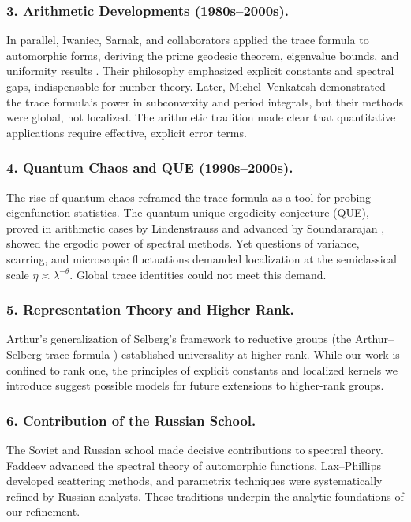 \subsubsection*{3. Arithmetic Developments (1980s–2000s).}
In parallel, Iwaniec, Sarnak, and collaborators applied the trace formula to automorphic forms,
deriving the prime geodesic theorem, eigenvalue bounds, and uniformity results
\cite{Iwaniec2002,LuoSarnak1995}. Their philosophy emphasized explicit constants and spectral gaps,
indispensable for number theory. Later, Michel–Venkatesh \cite{MichelVenkatesh2010}
demonstrated the trace formula’s power in subconvexity and period integrals,
but their methods were global, not localized.
The arithmetic tradition made clear that quantitative applications
require effective, explicit error terms.

\subsubsection*{4. Quantum Chaos and QUE (1990s–2000s).}
The rise of quantum chaos reframed the trace formula as a tool
for probing eigenfunction statistics.
The quantum unique ergodicity conjecture (QUE), proved in arithmetic cases
by Lindenstrauss \cite{LindenstraussQUE} and advanced by Soundararajan \cite{SoundararajanQUE},
showed the ergodic power of spectral methods.
Yet questions of variance, scarring, and microscopic fluctuations demanded
localization at the semiclassical scale $\eta\asymp\lambda^{-\theta}$.
Global trace identities could not meet this demand.

\subsubsection*{5. Representation Theory and Higher Rank.}
Arthur’s generalization of Selberg’s framework to reductive groups
(the Arthur–Selberg trace formula \cite{ArthurBook})
established universality at higher rank.
While our work is confined to rank one,
the principles of explicit constants and localized kernels we introduce
suggest possible models for future extensions to higher-rank groups.

\subsubsection*{6. Contribution of the Russian School.}
The Soviet and Russian school made decisive contributions to spectral theory.
Faddeev \cite{Faddeev1967} advanced the spectral theory of automorphic functions,
Lax–Phillips \cite{LaxPhillips1976} developed scattering methods,
and parametrix techniques were systematically refined by Russian analysts.
These traditions underpin the analytic foundations of our refinement.

